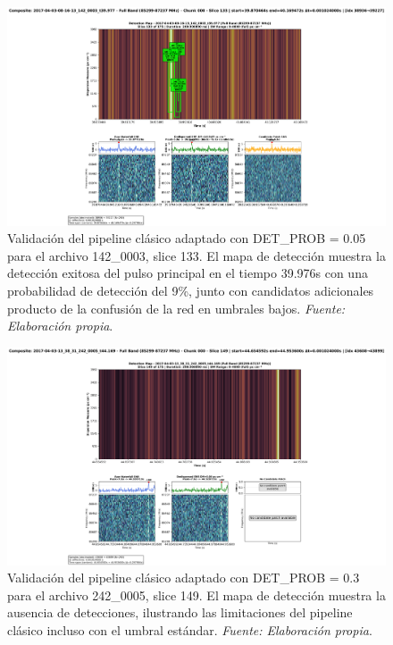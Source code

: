 \begin{figure}[H]
    \centering
    \includegraphics[width=\textwidth]{figures/2017-04-03-08-16-13_142_0003_t39.977_slice133-lowProb.png}
    \caption{Validación del pipeline clásico adaptado con DET\_PROB = 0.05 para el archivo 142\_0003, slice 133. El mapa de detección muestra la detección exitosa del pulso principal en el tiempo 39.976s con una probabilidad de detección del 9\%, junto con candidatos adicionales producto de la confusión de la red en umbrales bajos. \textit{Fuente: Elaboración propia}.}
    \label{fig:142_0003_slice133_lowProb}
\end{figure}

\begin{figure}[H]
    \centering
    \includegraphics[width=\textwidth]{figures/2017-04-03-13_38_31_242_0005_t44.169_slice149.png}
    \caption{Validación del pipeline clásico adaptado con DET\_PROB = 0.3 para el archivo 242\_0005, slice 149. El mapa de detección muestra la ausencia de detecciones, ilustrando las limitaciones del pipeline clásico incluso con el umbral estándar. \textit{Fuente: Elaboración propia}.}
    \label{fig:242_0005_slice149_highProb}
\end{figure}

